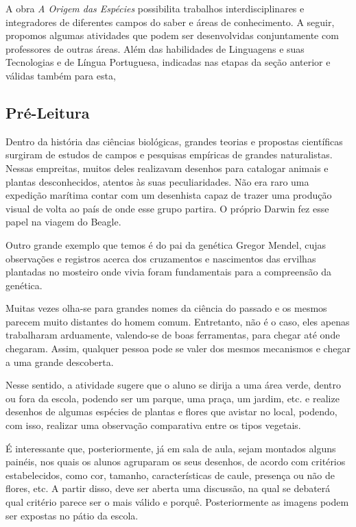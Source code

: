 \documentclass[12pt]{extarticle}
\begin{document}
A obra \emph{A Origem das Espécies} possibilita trabalhos
interdisciplinares e integradores de diferentes campos do saber e áreas
de conhecimento. A seguir, propomos algumas atividades que podem ser
desenvolvidas conjuntamente com professores de outras áreas. Além das
habilidades de Linguagens e suas Tecnologias e de Língua Portuguesa,
indicadas nas etapas da seção anterior e válidas também para esta,

\subsection{Pré-Leitura}

Dentro da história das ciências biológicas, grandes teorias
e propostas científicas surgiram de estudos de campos e pesquisas
empíricas de grandes naturalistas. Nessas empreitas, muitos deles
realizavam desenhos para catalogar animais e plantas desconhecidos,
atentos às suas peculiaridades. Não era raro uma expedição marítima
contar com um desenhista capaz de trazer uma produção visual de volta ao
país de onde esse grupo partira. O próprio Darwin fez esse papel na
viagem do Beagle.








Outro grande exemplo que temos é do pai da genética Gregor Mendel, cujas
observações e registros acerca dos cruzamentos e nascimentos das
ervilhas plantadas no mosteiro onde vivia foram fundamentais para a
compreensão da genética.

Muitas vezes olha-se para grandes nomes da ciência do passado e os
mesmos parecem muito distantes do homem comum. Entretanto, não é o caso,
eles apenas trabalharam arduamente, valendo-se de boas ferramentas, para
chegar até onde chegaram. Assim, qualquer pessoa pode se valer dos
mesmos mecanismos e chegar a uma grande descoberta.

Nesse sentido, a atividade sugere que o aluno se dirija a uma área
verde, dentro ou fora da escola, podendo ser um parque, uma praça, um
jardim, etc. e realize desenhos de algumas espécies de plantas e flores
que avistar no local, podendo, com isso, realizar uma observação
comparativa entre os tipos vegetais.

É interessante que, posteriormente, já em sala de aula, sejam montados
alguns painéis, nos quais os alunos agruparam os seus desenhos, de
acordo com critérios estabelecidos, como cor, tamanho, características
de caule, presença ou não de flores, etc. A partir disso, deve ser
aberta uma discussão, na qual se debaterá qual critério parece ser o
mais válido e porquê. Posteriormente as imagens podem ser expostas no
pátio da escola.
\end{document}
